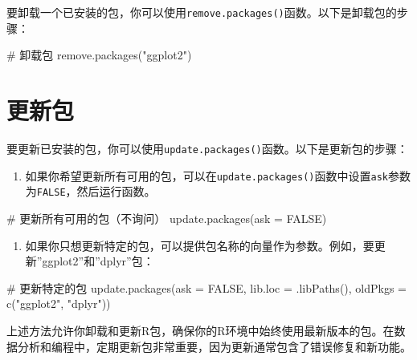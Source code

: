 \documentclass[
  letterpaper,
  DIV=11,
  numbers=noendperiod]{scrreprt}
\newenvironment{Shaded}{\begin{snugshade}}{\end{snugshade}}
\newcommand{\AttributeTok}[1]{\textcolor[rgb]{0.40,0.45,0.13}{#1}}
\newcommand{\CommentTok}[1]{\textcolor[rgb]{0.37,0.37,0.37}{#1}}
\newcommand{\ConstantTok}[1]{\textcolor[rgb]{0.56,0.35,0.01}{#1}}
\newcommand{\FunctionTok}[1]{\textcolor[rgb]{0.28,0.35,0.67}{#1}}
\newcommand{\NormalTok}[1]{\textcolor[rgb]{0.00,0.23,0.31}{#1}}
\newcommand{\StringTok}[1]{\textcolor[rgb]{0.13,0.47,0.30}{#1}}
\providecommand{\tightlist}{%
  \setlength{\itemsep}{0pt}\setlength{\parskip}{0pt}}\usepackage{longtable,booktabs,array}
\begin{document}
要卸载一个已安装的包，你可以使用\texttt{remove.packages()}函数。以下是卸载包的步骤：

\begin{Shaded}
\begin{Highlighting}[]
\CommentTok{\# 卸载包}
\FunctionTok{remove.packages}\NormalTok{(}\StringTok{"ggplot2"}\NormalTok{)}
\end{Highlighting}
\end{Shaded}

\section{更新包}\label{ux66f4ux65b0ux5305}

要更新已安装的包，你可以使用\texttt{update.packages()}函数。以下是更新包的步骤：

\begin{enumerate}
\def\labelenumi{\arabic{enumi}.}
\tightlist
\item
  如果你希望更新所有可用的包，可以在\texttt{update.packages()}函数中设置\texttt{ask}参数为\texttt{FALSE}，然后运行函数。
\end{enumerate}

\begin{Shaded}
\begin{Highlighting}[]
\CommentTok{\# 更新所有可用的包（不询问）}
\FunctionTok{update.packages}\NormalTok{(}\AttributeTok{ask =} \ConstantTok{FALSE}\NormalTok{)}
\end{Highlighting}
\end{Shaded}

\begin{enumerate}
\def\labelenumi{\arabic{enumi}.}
\setcounter{enumi}{1}
\tightlist
\item
  如果你只想更新特定的包，可以提供包名称的向量作为参数。例如，要更新''ggplot2''和''dplyr''包：
\end{enumerate}

\begin{Shaded}
\begin{Highlighting}[]
\CommentTok{\# 更新特定的包}
\FunctionTok{update.packages}\NormalTok{(}\AttributeTok{ask =} \ConstantTok{FALSE}\NormalTok{, }\AttributeTok{lib.loc =} \FunctionTok{.libPaths}\NormalTok{(), }\AttributeTok{oldPkgs =} \FunctionTok{c}\NormalTok{(}\StringTok{"ggplot2"}\NormalTok{, }\StringTok{"dplyr"}\NormalTok{))}
\end{Highlighting}
\end{Shaded}

上述方法允许你卸载和更新R包，确保你的R环境中始终使用最新版本的包。在数据分析和编程中，定期更新包非常重要，因为更新通常包含了错误修复和新功能。
\end{document}
